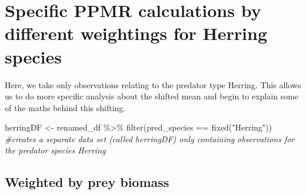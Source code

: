 \documentclass[
]{article}
\newenvironment{Shaded}{\begin{snugshade}}{\end{snugshade}}
\newcommand{\AttributeTok}[1]{\textcolor[rgb]{0.77,0.63,0.00}{#1}}
\newcommand{\CommentTok}[1]{\textcolor[rgb]{0.56,0.35,0.01}{\textit{#1}}}
\newcommand{\ConstantTok}[1]{\textcolor[rgb]{0.00,0.00,0.00}{#1}}
\newcommand{\FunctionTok}[1]{\textcolor[rgb]{0.00,0.00,0.00}{#1}}
\newcommand{\NormalTok}[1]{#1}
\newcommand{\OtherTok}[1]{\textcolor[rgb]{0.56,0.35,0.01}{#1}}
\newcommand{\SpecialCharTok}[1]{\textcolor[rgb]{0.00,0.00,0.00}{#1}}
\newcommand{\StringTok}[1]{\textcolor[rgb]{0.31,0.60,0.02}{#1}}
\begin{document}
\hypertarget{specific-ppmr-calculations-by-different-weightings-for-herring-species}{%
\section{Specific PPMR calculations by different weightings for Herring
species}\label{specific-ppmr-calculations-by-different-weightings-for-herring-species}}

Here, we take only observations relating to the predator type Herring.
This allows us to do more specific analysis about the shifted mean and
begin to explain some of the maths behind this shifting.

\begin{Shaded}
\begin{Highlighting}[]
\NormalTok{herringDF }\OtherTok{\textless{}{-}}\NormalTok{ renamed\_df }\SpecialCharTok{\%\textgreater{}\%} 
    \FunctionTok{filter}\NormalTok{(pred\_species }\SpecialCharTok{==} \FunctionTok{fixed}\NormalTok{(}\StringTok{"Herring"}\NormalTok{))}
\CommentTok{\#creates a separate data set (called \textquotesingle{}herringDF\textquotesingle{}) only containing observations for the predator species \textquotesingle{}Herring\textquotesingle{}}
\end{Highlighting}
\end{Shaded}

\hypertarget{weighted-by-prey-biomass-1}{%
\subsection{Weighted by prey biomass}\label{weighted-by-prey-biomass-1}}

\begin{Shaded}
\end{Shaded}
\end{document}
